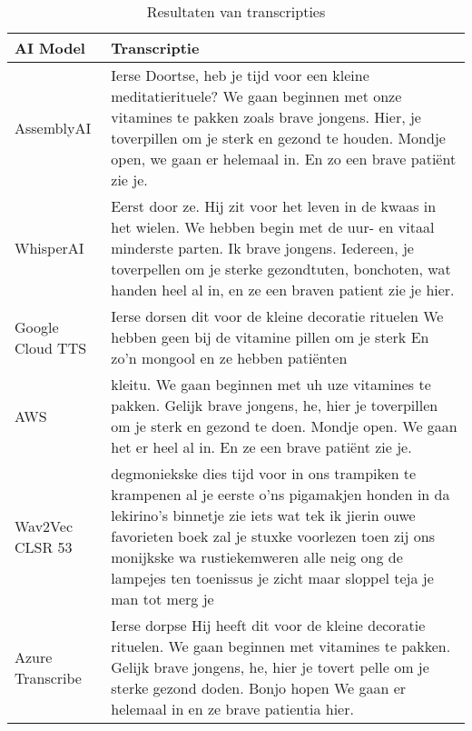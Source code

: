 \begin{table}[htbp]
    \centering
    \label{tab:results_sample3}
    \begin{tabularx}{\textwidth}{|l|X|}
        \hline
        \textbf{AI Model} & \textbf{Transcriptie} \\ \midrule
        
        AssemblyAI &      Ierse Doortse, heb je tijd voor een kleine meditatierituele? We gaan beginnen met onze vitamines te pakken zoals brave jongens. Hier, je toverpillen om je sterk en gezond te houden. Mondje open, we gaan er helemaal in. En zo een brave patiënt zie je.
        
        \\ \hline
        
        WhisperAI &     Eerst door ze. Hij zit voor het leven in de kwaas in het wielen. We hebben begin met de uur- en vitaal minderste parten. Ik brave jongens. Iedereen, je toverpellen om je sterke gezondtuten, bonchoten, wat handen heel al in, en ze een braven patient zie je hier.
        
        \\ \hline
        
        Google Cloud TTS &    Ierse dorsen dit voor de kleine decoratie rituelen We hebben geen bij de vitamine pillen om je sterk En zo'n mongool en ze hebben patiënten
        
        \\ \hline
        
        AWS &       kleitu. We gaan beginnen met uh uze vitamines te pakken. Gelijk brave jongens, he, hier je toverpillen om je sterk en gezond te doen. Mondje open. We gaan het er heel al in. En ze een brave patiënt zie je.
        
        \\ \hline
        
        Wav2Vec CLSR 53 &     degmoniekske dies tijd voor in ons trampiken te krampenen al je eerste o'ns pigamakjen honden in da lekirino's binnetje zie iets wat tek ik jierin ouwe favorieten boek zal je stuxke voorlezen toen zij ons monijkske wa rustiekemweren alle neig ong de lampejes ten toenissus je zicht maar sloppel teja je man tot merg je
        \\ \hline
        
        Azure Transcribe &        Ierse dorpse Hij heeft dit voor de kleine decoratie rituelen. We gaan beginnen met vitamines te pakken. Gelijk brave jongens, he, hier je tovert pelle om je sterke gezond doden. Bonjo hopen We gaan er helemaal in en ze brave patientia hier.
        
        \\ \hline
    \end{tabularx}
    \caption{Resultaten van transcripties}
\end{table}
\FloatBarrier

